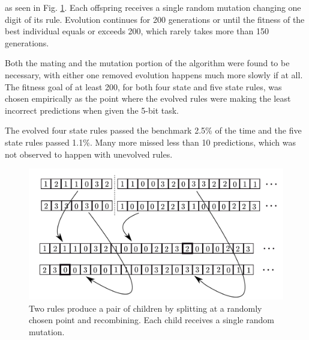 \documentclass{elsarticle}
\begin{document}
\begin{multicols}{2}
        as seen in Fig.  \ref{GA}. Each offspring receives a single random 
            mutation changing one digit of its rule.  Evolution continues for 
            200 generations or until the fitness of the best individual equals 
            or exceeds 200, which rarely takes more than 150 generations.  \par 
            Both the mating and the mutation portion of the algorithm were 
            found to be necessary, with either one removed evolution happens 
            much more slowly if at all. The fitness goal of at least 200, for 
            both four state and five state rules, was chosen empirically as the 
            point where the evolved rules were making the least incorrect 
            predictions when given the 5-bit task.  \par
	The evolved four state rules passed the benchmark 2.5\% of the time and 
	the five state rules passed 1.1\%. Many more missed less than 10 
	predictions, which was not observed to happen with unevolved rules.
	
	
	\begin{figure}[H]
		\centering
		\includegraphics[width=\linewidth]{GA.pdf}
		\caption{Two rules produce a pair of children by splitting at a randomly 
			chosen point and recombining. Each child receives a single random 
		mutation.}
		\label{GA}
	\end{figure}
	

\end{multicols}
\end{document}
